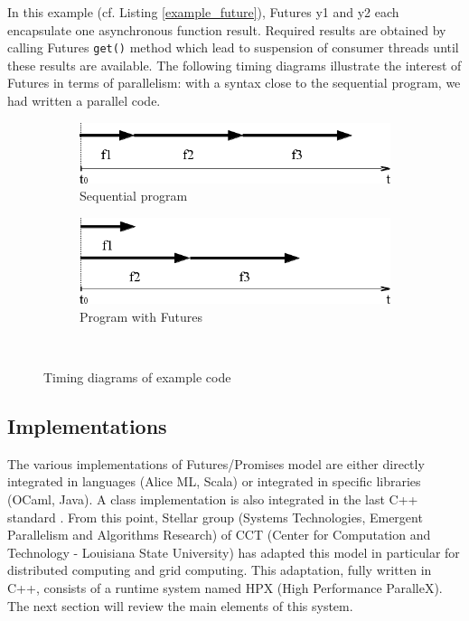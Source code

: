 \documentclass{llncs}
\begin{document}
In this example (cf. Listing \ref{example_future}), Futures y1 and y2 each
encapsulate one asynchronous function result. Required results are obtained by
calling Futures \texttt{get()} method which lead to suspension of consumer
threads until these results are available. The following timing diagrams
illustrate the interest of Futures in terms of parallelism: with a syntax close
to the sequential program, we had written a parallel code.

\begin{figure}[h]
      \begin{subfigure}[b]{0.5\textwidth}
	      \centering
	      \includegraphics[scale=0.4]{Images/Im2.png}
	      \caption{Sequential program}
	      
      \end{subfigure}
      \begin{subfigure}[b]{0.5\textwidth}
	      \centering
	      \includegraphics[scale=0.4]{Images/Im3.png}
	      \caption{Program with Futures}
      \end{subfigure}\\
      
      \caption{Timing diagrams of example code}
      \label{chronofuture}
\end{figure}

\subsection{Implementations}
The various implementations of Futures/Promises model are either directly
integrated in languages (Alice ML, Scala) or integrated in specific libraries
(OCaml, Java). A class implementation is also integrated in the last C++
standard \cite{Futuresc++}. From this point, Stellar group (Systems
Technologies, Emergent Parallelism and Algorithms Research) of CCT (Center for
Computation and Technology - Louisiana State University) has adapted this model
in particular for distributed computing and grid computing. This adaptation,
fully written in C++, consists of a runtime system named HPX (High Performance
ParalleX). The next section will review the main elements of this system.   
\end{document}
